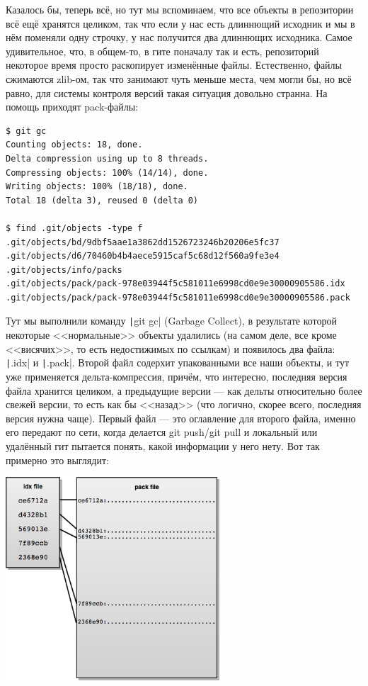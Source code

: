 \documentclass{../../text-style}
\begin{document}
Казалось бы, теперь всё, но тут мы вспоминаем, что все объекты в репозитории всё ещё хранятся целиком, так что если у нас есть длиннющий исходник и мы в нём поменяли одну строчку, у нас получится два длиннющих исходника. Самое удивительное, что, в общем-то, в гите поначалу так и есть, репозиторий некоторое время просто раскопирует изменённые файлы. Естественно, файлы сжимаются zlib-ом, так что занимают чуть меньше места, чем могли бы, но всё равно, для системы контроля версий такая ситуация довольно странна. На помощь приходят pack-файлы:

\begin{verbatim}
$ git gc
Counting objects: 18, done.
Delta compression using up to 8 threads.
Compressing objects: 100% (14/14), done.
Writing objects: 100% (18/18), done.
Total 18 (delta 3), reused 0 (delta 0)

$ find .git/objects -type f
.git/objects/bd/9dbf5aae1a3862dd1526723246b20206e5fc37
.git/objects/d6/70460b4b4aece5915caf5c68d12f560a9fe3e4
.git/objects/info/packs
.git/objects/pack/pack-978e03944f5c581011e6998cd0e9e30000905586.idx
.git/objects/pack/pack-978e03944f5c581011e6998cd0e9e30000905586.pack
\end{verbatim}

Тут мы выполнили команду \texttt|git gc| (Garbage Collect), в результате которой некоторые <<нормальные>> объекты удалились (на самом деле, все кроме <<висячих>>, то есть недостижимых по ссылкам) и появилось два файла: \texttt|.idx| и \texttt|.pack|. Второй файл содерхит упакованными все наши объекты, и тут уже применяется дельта-компрессия, причём, что интересно, последняя версия файла хранится целиком, а предыдущие версии --- как дельты относительно более свежей версии, то есть как бы <<назад>> (что логично, скорее всего, последняя версия нужна чаще). Первый файл --- это оглавление для второго файла, именно его передают по сети, когда делается git push/git pull и локальный или удалённый гит пытается понять, какой информации у него нету. Вот так примерно это выглядит:

\begin{center}
	\includegraphics[width=0.6\textwidth]{gitPackFiles.png}
\end{center}
\end{document}
